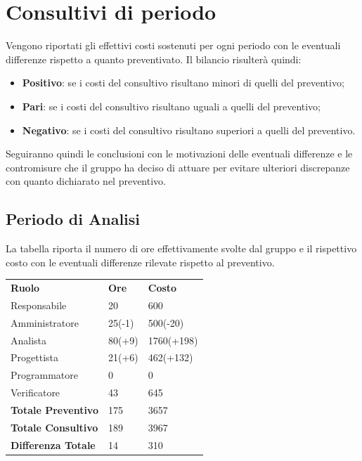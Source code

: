 \section{Consultivi di periodo}
Vengono riportati gli effettivi costi sostenuti per ogni periodo con le eventuali differenze rispetto a quanto preventivato. Il bilancio risulterà quindi:
\begin{itemize}
	\item \textbf{Positivo}: se i costi del consultivo risultano minori di quelli del preventivo;
	\item \textbf{Pari}: se i costi del consultivo risultano uguali a quelli del preventivo;
	\item \textbf{Negativo}: se i costi del consultivo risultano superiori a quelli del preventivo.
\end{itemize}
Seguiranno quindi le conclusioni con le motivazioni delle eventuali differenze e le contromisure che il gruppo ha deciso di attuare per evitare ulteriori discrepanze con quanto dichiarato nel preventivo.
	\subsection{Periodo di Analisi}
	La tabella riporta il numero di ore effettivamente svolte dal gruppo e il rispettivo costo con le eventuali differenze rilevate rispetto al preventivo.
	\begin{longtable} {							
			>{}p{40mm}  
			>{}p{20mm}	
			>{}p{28mm}			
		}			
		\rowcolor{gray!50}
		
		\textbf{Ruolo} & \textbf{Ore} & \textbf{Costo} \TBstrut \\
		Responsabile & 20 & 600 \TBstrut \\
		Amministratore & 25(-1) & 500(-20) \TBstrut \\
		Analista & 80(+9)& 1760(+198) \TBstrut \\
		Progettista & 21(+6) & 462(+132) \TBstrut \\
		Programmatore & 0 & 0 \TBstrut \\
		Verificatore & 43 & 645 \TBstrut \\
		\textbf{Totale Preventivo} & 175 & 3657	\TBstrut \\	
		\textbf{Totale Consultivo} & 189 & 3967	\TBstrut \\	
		\textbf{Differenza Totale} & 14 & 310 	\TBstrut \\	
	\end{longtable}

